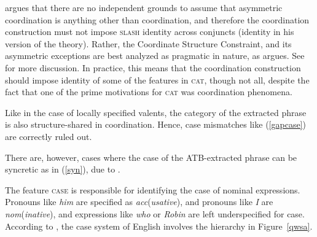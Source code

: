 {\citet{chavesextr} argues that there are no independent grounds to assume that asymmetric coordination is anything other than coordination, and therefore the coordination construction must not impose \textsc{slash} identity across conjuncts (\gap identity in his version of the theory). Rather, the Coordinate Structure Constraint, and its asymmetric exceptions are best analyzed as
pragmatic in nature, as \citet[Chapter~5]{kehler} argues. 
See  for more discussion.
In practice, this means that the coordination construction should impose identity of some of the features in \textsc{cat}, though not all, despite the fact that one of the prime motivations for \textsc{cat} was
coordination phenomena.

Like in the case of locally specified valents, the category of the extracted phrase is also structure-shared
in coordination. Hence, case mismatches like (\ref{gapcase}) are
correctly ruled out.


\z

\noindent
There are, however, cases where the case of the ATB-extracted phrase can be syncretic as in (\ref{syn}), 
due to \citet[205]{levineetal}. 

\eal
\label{syn}

\zl

The feature \textsc{case} is responsible for identifying the case of nominal expressions.
Pronouns like \emph{him} are specified as \emph{acc}(\emph{usative}), and pronouns like
\emph{I} are \emph{nom}(\emph{inative}), and expressions like \emph{who} or
\emph{Robin} are left underspecified for case.
According to  \citet[207]{levineetal},  the case system of English involves 
the  hierarchy  in Figure~\ref{qwsa}.


}
